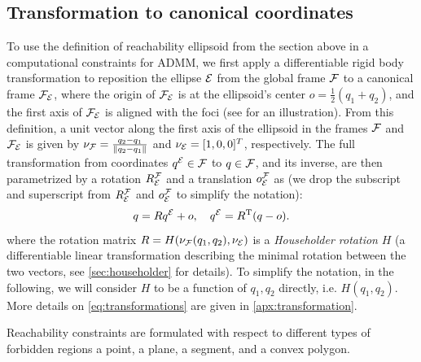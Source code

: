 \documentclass[10pt,twocolumn,twoside]{IEEEtran}
\newcommand{\new}[1]{\textcolor{blue}{#1}}
\newcommand{\news}{\color{blue}}
\begin{document}
\subsection{Transformation to canonical coordinates}\label{sec:rotation2Standard}
\newcommand{\oFE}{o}
{\news To use the definition of reachability ellipsoid from the section above in a computational constraints for ADMM, we first apply a differentiable rigid body transformation to reposition the ellipse $\mathcal{E}$ from the global frame $\mathcal{F}$ to a canonical frame $\mathcal{F}_{\mathcal{E}}$, where the origin of $\mathcal{F}_{\mathcal{E}}$ is at the ellipsoid's center $\oFE = \frac{1}{2}(q_1+q_2)$, and the first axis of $\mathcal{F}_{\mathcal{E}}$ is aligned with the foci (see  for an illustration). 
From this definition, a unit vector along the first axis of the ellipsoid in the frames $\mathcal{F}$ and $\mathcal{F}_{\mathcal{E}}$ is given by $\nu_{\mathcal{F}} = \frac{q_2-q_1}{\lVert q_2-q_1\rVert}$ and $\nu_{\mathcal{E}} =[1,0,0]^T$, respectively.
The full transformation from coordinates $q^{\mathcal{E}}\in\mathcal{F}$ to $q\in\mathcal{F}$, and its inverse, are then parametrized by a rotation $R^{\mathcal{F}}_{\mathcal{E}}$ and a translation $o^{\mathcal{F}}_{\mathcal{E}}$ as (we drop the subscript and superscript from $R^{\mathcal{F}}_{\mathcal{E}}$ and $o^{\mathcal{F}}_{\mathcal{E}}$ to simplify the notation):
\begin{equation}\label{eq:transformations}
  q=R\Eframe{q}+\oFE,\quad
  \Eframe{q}=R\transpose(q-\oFE).
\end{equation}
where the rotation matrix $R=H(\nu_{\mathcal{F}}(q_1,q_2),\nu_{\mathcal{E}})$ is a \emph{Householder rotation} $H$ (a differentiable linear transformation describing the minimal rotation between the two vectors, see \cref{sec:householder} for details).  To simplify the notation, in the following, we will consider $H$ to be a function of $q_1,q_2$ directly, i.e. $H(q_1,q_2)$. More details on \eqref{eq:transformations} are given in \cref{apx:transformation}.

  Reachability constraints are formulated with respect to different types of forbidden regions a point, a plane, a segment, and a convex polygon.}
\end{document}
